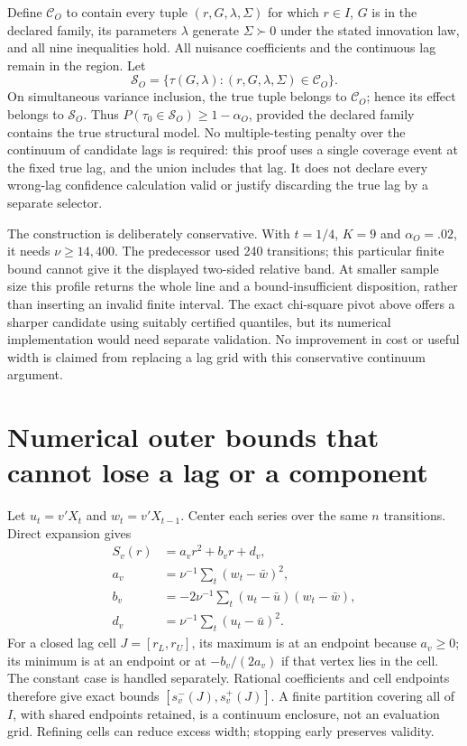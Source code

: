 Define \(\mathcal C_O\) to contain every tuple \((r,G,\lambda,\Sigma)\)
for which \(r\in I\), \(G\) is in the declared family, its parameters
\(\lambda\) generate \(\Sigma\succ0\) under the stated innovation law,
and all nine inequalities hold. All nuisance coefficients and the
continuous lag remain in the region. Let \[
 \mathcal S_O=\{\tau(G,\lambda):(r,G,\lambda,\Sigma)\in\mathcal C_O\}.
\] On simultaneous variance inclusion, the true tuple belongs to
\(\mathcal C_O\); hence its effect belongs to \(\mathcal S_O\). Thus
\(P(\tau_0\in\mathcal S_O)\ge1-\alpha_O\), provided the declared family
contains the true structural model. No multiple-testing penalty over the
continuum of candidate lags is required: this proof uses a single
coverage event at the fixed true lag, and the union includes that lag.
It does not declare every wrong-lag confidence calculation valid or
justify discarding the true lag by a separate selector.

The construction is deliberately conservative. With \(t=1/4\), \(K=9\)
and \(\alpha_O=.02\), it needs \(\nu\ge14{,}400\). The predecessor used
240 transitions; this particular finite bound cannot give it the
displayed two-sided relative band. At smaller sample size this profile
returns the whole line and a bound-insufficient disposition, rather than
inserting an invalid finite interval. The exact chi-square pivot above
offers a sharper candidate using suitably certified quantiles, but its
numerical implementation would need separate validation. No improvement
in cost or useful width is claimed from replacing a lag grid with this
conservative continuum argument.

\hypertarget{numerical-outer-bounds-that-cannot-lose-a-lag-or-a-component}{%
\section{Numerical outer bounds that cannot lose a lag or a
component}\label{numerical-outer-bounds-that-cannot-lose-a-lag-or-a-component}}

Let \(u_t=v'X_t\) and \(w_t=v'X_{t-1}\). Center each series over the
same \(n\) transitions. Direct expansion gives \[
 \begin{aligned}
 S_v(r)&=a_vr^2+b_vr+d_v,\\
 a_v&=\nu^{-1}\sum_t(w_t-\bar w)^2,\\
 b_v&=-2\nu^{-1}\sum_t(u_t-\bar u)(w_t-\bar w),\\
 d_v&=\nu^{-1}\sum_t(u_t-\bar u)^2.
 \end{aligned}
\] For a closed lag cell \(J=[r_L,r_U]\), its maximum is at an endpoint
because \(a_v\ge0\); its minimum is at an endpoint or at \(-b_v/(2a_v)\)
if that vertex lies in the cell. The constant case is handled
separately. Rational coefficients and cell endpoints therefore give
exact bounds \([s^-_v(J),s^+_v(J)]\). A finite partition covering all of
\(I\), with shared endpoints retained, is a continuum enclosure, not an
evaluation grid. Refining cells can reduce excess width; stopping early
preserves validity.

